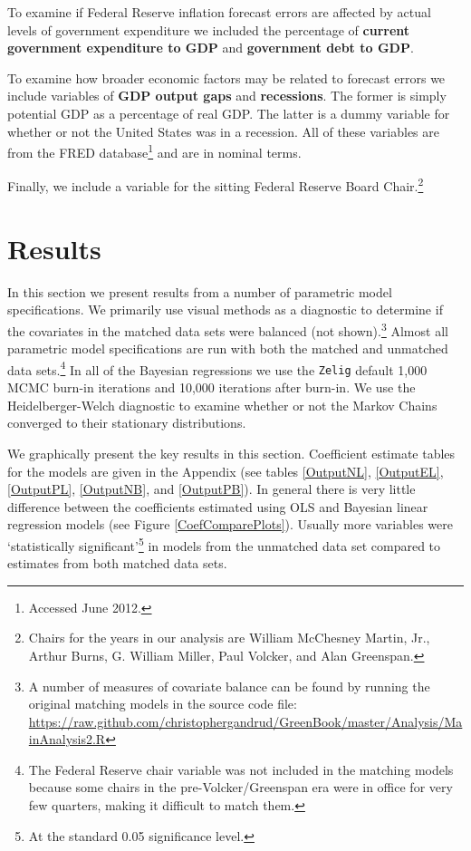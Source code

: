 \documentclass[a4paper]{article}\usepackage{graphicx, color}
\begin{document}
To examine if Federal Reserve inflation forecast errors are affected by actual levels of government expenditure we included the percentage of {\bf{current government expenditure to GDP}} and {\bf{government debt to GDP}}. 

To examine how broader economic factors may be related to forecast errors we include variables of {\bf{GDP output gaps}} and {\bf{recessions}}. The former is simply potential GDP as a percentage of real GDP. The latter is a dummy variable for whether or not the United States was in a recession. All of these variables are from the FRED database\footnote{Accessed June 2012.} and are in nominal terms. 

Finally, we include a variable for the sitting Federal Reserve Board Chair.\footnote{Chairs for the years in our analysis are William McChesney Martin, Jr., Arthur Burns, G. William Miller, Paul Volcker, and Alan Greenspan.}

\section{Results}

In this section we present results from a number of parametric model specifications. We primarily use visual methods as a diagnostic to determine if the covariates in the matched data sets were balanced (not shown).\footnote{A number of measures of covariate balance can be found by running the original matching models in the source code file: {\url{https://raw.github.com/christophergandrud/GreenBook/master/Analysis/MainAnalysis2.R}}}  Almost all parametric model specifications are run with both the matched and unmatched data sets.\footnote{The Federal Reserve chair variable was not included in the matching models because some chairs in the pre-Volcker/Greenspan era were in office for very few quarters, making it difficult to match them.} In all of the Bayesian regressions we use the {\tt{Zelig}} default 1,000 MCMC burn-in iterations and 10,000 iterations after burn-in. We use the Heidelberger-Welch diagnostic to examine whether or not the Markov Chains converged to their stationary distributions.

We graphically present the key results in this section. Coefficient estimate tables for the models are given in the Appendix (see tables \ref{OutputNL}, \ref{OutputEL}, \ref{OutputPL}, \ref{OutputNB}, and \ref{OutputPB}). In general there is very little difference between the coefficients estimated using OLS and Bayesian linear regression models (see Figure \ref{CoefComparePlots}). Usually more variables were `statistically significant'\footnote{At the standard 0.05 significance level.} in models from the unmatched data set compared to estimates from both matched data sets.
\end{document}
